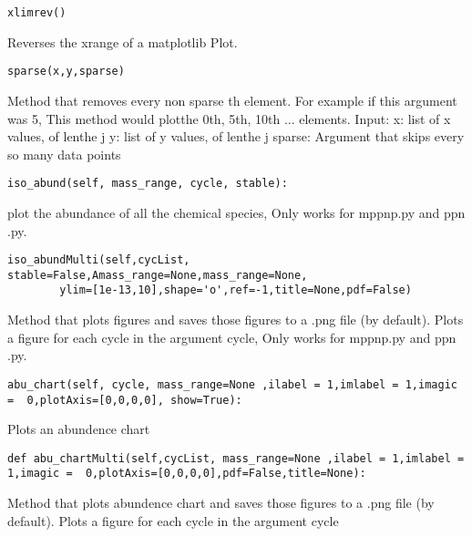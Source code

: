 \begin{verbatim}
xlimrev()
\end{verbatim}
Reverses the xrange of a matplotlib Plot.\newline\newline
\begin{verbatim}
sparse(x,y,sparse)
\end{verbatim}
Method that removes every non sparse th element.  For example 
if this argument was 5, This method would plotthe 0th, 5th, 10th ... elements.\newline
Input:\newline
x: list of x values, of lenthe j\newline
y: list of y values, of lenthe j\newline
sparse: Argument that skips every so many data points\newline\newline
\begin{verbatim}
iso_abund(self, mass_range, cycle, stable):
\end{verbatim}
plot the abundance of all the chemical species, Only works for mppnp.py and ppn .py.\newline\newline
\begin{verbatim}
iso_abundMulti(self,cycList, stable=False,Amass_range=None,mass_range=None,
		ylim=[1e-13,10],shape='o',ref=-1,title=None,pdf=False)
\end{verbatim}
Method that plots figures and saves those figures to a .png file 
(by default). Plots a figure for each cycle in the argument cycle, Only works for mppnp.py and ppn .py.\newline\newline
\begin{verbatim}
abu_chart(self, cycle, mass_range=None ,ilabel = 1,imlabel = 1,imagic =  0,plotAxis=[0,0,0,0], show=True):
\end{verbatim}
Plots an abundence chart\newline \newline
\begin{verbatim}
def abu_chartMulti(self,cycList, mass_range=None ,ilabel = 1,imlabel = 1,imagic =  0,plotAxis=[0,0,0,0],pdf=False,title=None):
\end{verbatim}
Method that plots abundence chart and saves those figures to a .png file 
		(by default). Plots a figure for each cycle in the argument cycle\newline\newline
		
